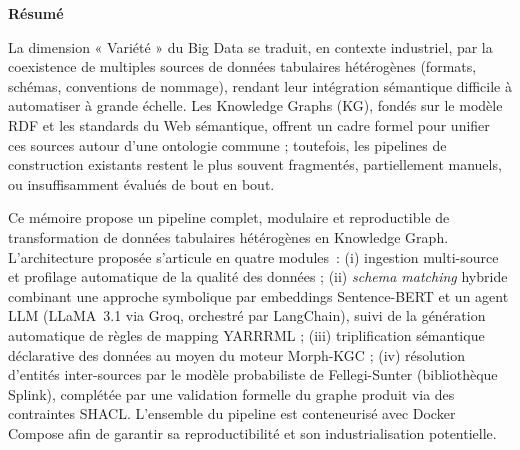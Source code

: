 
\clearpage

\begin{center}
    \vspace*{-1cm} %
    {\Huge\bfseries Résumé}
    \vspace{0.5cm} %
\end{center}

La dimension « Variété » du Big Data se traduit, en contexte
industriel, par la coexistence de multiples sources de données
tabulaires hétérogènes (formats, schémas, conventions de nommage),
rendant leur intégration sémantique difficile à automatiser à grande
échelle. Les Knowledge Graphs (KG), fondés sur le modèle RDF et les
standards du Web sémantique, offrent un cadre formel pour unifier ces
sources autour d'une ontologie commune ; toutefois, les pipelines de
construction existants restent le plus souvent fragmentés,
partiellement manuels, ou insuffisamment évalués de bout en bout.

Ce mémoire propose un pipeline complet, modulaire et reproductible de
transformation de données tabulaires hétérogènes en Knowledge Graph.
L'architecture proposée s'articule en quatre modules~: (i) ingestion
multi-source et profilage automatique de la qualité des données ;
(ii) \textit{schema matching} hybride combinant une approche
symbolique par embeddings Sentence-BERT et un agent LLM (LLaMA~3.1
via Groq, orchestré par LangChain), suivi de la génération
automatique de règles de mapping YARRRML ; (iii) triplification
sémantique déclarative des données au moyen du moteur Morph-KGC ;
(iv) résolution d'entités inter-sources par le modèle probabiliste de
Fellegi-Sunter (bibliothèque Splink), complétée par une validation
formelle du graphe produit via des contraintes SHACL. L'ensemble du
pipeline est conteneurisé avec Docker Compose afin de garantir sa
reproductibilité et son industrialisation potentielle.

